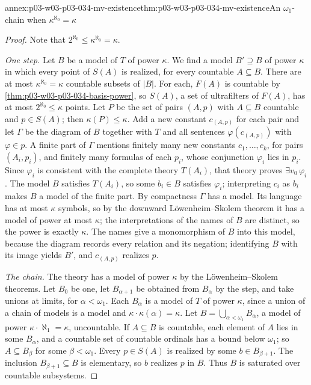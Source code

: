 \begin{annexitem}{annex:p03-w03-p03-034-mv-existence}{thm:p03-w03-p03-034-mv-existence}{An \(\omega_1\)-chain when \(\kappa^{\aleph_0}=\kappa\)}
\begin{proof}
Note that \(2^{\aleph_0}\leq\kappa^{\aleph_0}=\kappa\).

\emph{One step.} Let \(B\) be a model of \(T\) of power \(\kappa\). We find a
model \(B'\supseteq B\) of power \(\kappa\) in which every point of
\(S(A)\) is realized, for every countable \(A\subseteq B\). There are at
most \(\kappa^{\aleph_0}=\kappa\) countable subsets of \(|B|\). For each,
\(F(A)\) is countable by \cref{thm:p03-w03-p03-034-basis-power}, so
\(S(A)\), a set of ultrafilters of \(F(A)\), has at most
\(2^{\aleph_0}\leq\kappa\) points. Let \(P\) be the set of pairs
\((A,p)\) with \(A\subseteq B\) countable and \(p\in S(A)\); then
\(\kappa(P)\leq\kappa\). Add a new constant \(c_{(A,p)}\) for each pair
and let \(\Gamma\) be the diagram of \(B\) together with \(T\) and all
sentences \(\varphi(c_{(A,p)})\) with \(\varphi\in p\). A finite part of
\(\Gamma\) mentions finitely many new constants
\(c_1,\ldots,c_k\), for pairs \((A_i,p_i)\), and finitely many formulas of
each \(p_i\), whose conjunction \(\varphi_i\) lies in \(p_i\). Since
\(\varphi_i\) is consistent with the complete theory \(T(A_i)\), that
theory proves \(\exists v_0\,\varphi_i\). The model \(B\) satisfies
\(T(A_i)\), so some \(b_i\in B\) satisfies \(\varphi_i\); interpreting
\(c_i\) as \(b_i\) makes \(B\) a model of the finite part. By compactness
\(\Gamma\) has a model. Its language has at most \(\kappa\) symbols, so by
the downward Löwenheim--Skolem theorem it has a model of power at most
\(\kappa\); the interpretations of the names of \(B\) are distinct, so the
power is exactly \(\kappa\). The names give a monomorphism of \(B\) into
this model, because the diagram records every relation and its negation;
identifying \(B\) with its image yields \(B'\), and \(c_{(A,p)}\) realizes
\(p\).

\emph{The chain.} The theory has a model of power \(\kappa\) by the
Löwenheim--Skolem theorems. Let \(B_0\) be one, let \(B_{\alpha+1}\) be
obtained from \(B_\alpha\) by the step, and take unions at limits, for
\(\alpha<\omega_1\). Each \(B_\alpha\) is a model of \(T\) of power
\(\kappa\), since a union of a chain of models is a model and
\(\kappa\cdot\kappa(\alpha)=\kappa\). Let \(B=\bigcup_{\alpha<\omega_1}
B_\alpha\), a model of power \(\kappa\cdot\aleph_1=\kappa\), uncountable.
If \(A\subseteq B\) is countable, each element of \(A\) lies in some
\(B_\alpha\), and a countable set of countable ordinals has a bound below
\(\omega_1\); so \(A\subseteq B_\beta\) for some \(\beta<\omega_1\). Every
\(p\in S(A)\) is realized by some \(b\in B_{\beta+1}\). The inclusion
\(B_{\beta+1}\subseteq B\) is elementary, so \(b\) realizes \(p\) in
\(B\). Thus \(B\) is saturated over countable subsystems.
\end{proof}
\end{annexitem}

